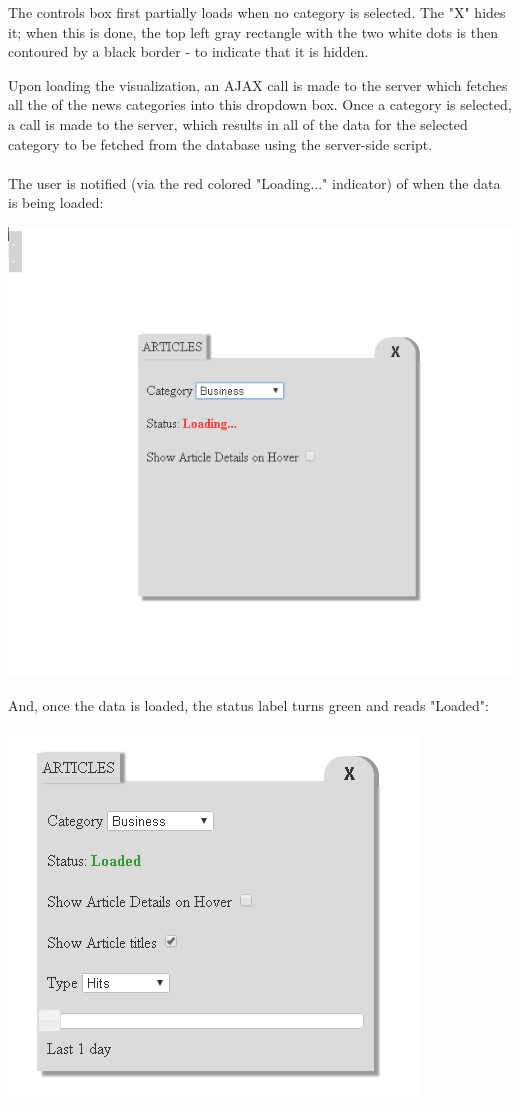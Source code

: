 \documentclass[12pt]{article}
\begin{document}
\noindent The controls box first partially loads when no category is selected. The "X" hides it; when this is done, the top left gray rectangle with the two white dots is then contoured by a black border - to indicate that it is hidden.

Upon loading the visualization, an AJAX call is made to the server which fetches all the of the news categories into this dropdown box. Once a category is selected, a call is made to the server, which results in all of the data for the selected category to be fetched from the database using the server-side script.\\ \\ The user is notified (via the red colored "Loading..." indicator) of when the data is being loaded:

\noindent\includegraphics[scale=0.6]{img/viz_4}

And, once the data is loaded, the status label turns green and reads "Loaded":

\noindent\includegraphics[scale=0.6]{img/viz_5}
\end{document}

